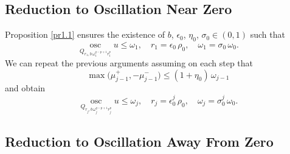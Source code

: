 \documentclass[a4paper,11pt,fullpage]{article}
\DeclareMathOperator*{\osc}{osc}
\numberwithin{equation}{section}
\begin{document}
\subsection{Reduction to Oscillation Near Zero}

Proposition \ref{pr1.1} ensures the existence of $b$, $\epsilon_0$, $\eta_0$, $\sigma_0 \in (0, 1)$ such that
\begin{equation}\label{eq5.3}
\osc\limits_{Q_{r_1, b\,\omega^{q-p+1}_1 r^p_1}} u\leqslant \omega_1,\quad r_1=\epsilon_0\,\rho_0,\quad \omega_1=\sigma_0\,\omega_0.
\end{equation}
We can repeat the previous arguments assuming
on each step that 
\begin{equation}\label{eq5.4}
\max\big(\mu^+_{j-1}, -\mu^-_{j-1}\big)\leqslant (1+\eta_0)\,\omega_{j-1}
\end{equation}
and obtain
\begin{equation}\label{eq5.5}
\osc\limits_{Q_{r_j, b\,\omega^{q-p+1}_j r^p_j}} u\leqslant \omega_j,\quad r_j=\epsilon^j_0\,\rho_0,\quad \omega_j=\sigma^j_0\,\omega_0.
\end{equation}

\subsection{Reduction to Oscillation Away From Zero}
\end{document}

